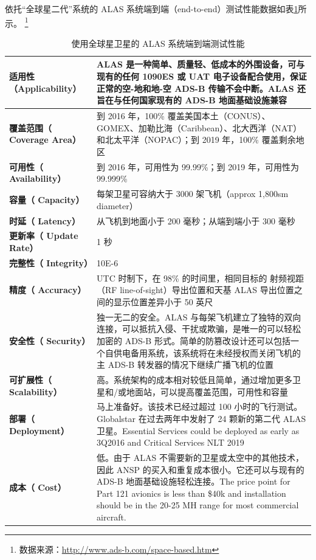 依托“全球星二代”系统的 ALAS 系统端到端（end-to-end）测试性能数据如表\ref{tab:alas-paras}所示。 \footnote{数据来源：\url{http://www.ads-b.com/space-based.htm}}

\renewcommand\arraystretch{1.5}
\begin{table}[htbp]
\centering
\caption{使用全球星卫星的 ALAS 系统端到端测试性能}
\label{tab:alas-paras}
\begin{tabular}[b]{|p{4cm}<{\raggedleft}|p{11cm}<{\raggedright}|}
\hline
\textbf{适用性
（Applicability）} &
ALAS 是一种简单、质量轻、低成本的外围设备，可与现有的任何 1090ES 或 UAT 电子设备配合使用，保证正常的空-地和地-空 ADS-B 传输不会中断。ALAS 还旨在与任何国家现有的 ADS-B 地面基础设施兼容\\
\hline
\textbf{覆盖范围（
Coverage Area）} &
到 2016 年，100\% 覆盖美国本土（CONUS）、GOMEX、加勒比海（Caribbean）、北大西洋（NAT）和北太平洋（NOPAC）；到 2019 年，100\% 覆盖剩余地区\\
\hline
\textbf{可用性（
Availability）} & 到 2016 年，可用性为 99.99\%；到 2019 年，可用性为 99.999\% \\
\hline
\textbf{容量（
Capacity） }& 每架卫星可容纳大于 3000 架飞机（approx 1,800sm diameter）\\
\hline
\textbf{时延（
Latency）} &  从飞机到地面小于 200 毫秒；从端到端小于 300 毫秒 \\
\hline
\textbf{更新率（
Update Rate）} & 1 秒 \\
\hline
\textbf{完整性（
Integrity）} & 10E-6 \\
\hline
\textbf{精度（
Accuracy）} &
UTC 时制下，在 98\% 的时间里，相同目标的 射频视距（RF line-of-sight）导出位置和天基 ALAS 导出位置之间的显示位置差异小于 50 英尺\\
\hline
\textbf{安全性（
Security）} & 独一无二的安全。ALAS 与每架飞机建立了独特的双向连接，可以抵抗入侵、干扰或欺骗，是唯一的可以轻松加密的 ADS-B 形式。简单的防篡改设计还可以包括一个自供电备用系统，该系统将在未经授权而关闭飞机的主 ADS-B 转发器的情况下继续广播飞机的位置 \\
\hline
\textbf{可扩展性（
Scalability）}  & 高。系统架构的成本相对较低且简单，通过增加更多卫星和/或地面站，可以提高覆盖范围，可用性和容量 \\
\hline
\textbf{部署（
Deployment）} & 马上准备好。该技术已经过超过 100 小时的飞行测试。Globalstar 在过去两年中发射了 24 颗新的第二代 ALAS 卫星。Essential Services could be deployed as early as 3Q2016 and Critical Services NLT 2019\\
\hline
\textbf{成本（
Cost）} & 低。由于 ALAS 不需要新的卫星或太空中的其他技术，因此 ANSP 的买入和重复成本很小。它还可以与现有的 ADS-B 地面基础设施轻松连接。The price point for Part 121 avionics is less than \$40k and installation should be in the 20-25 MH range for most commercial aircraft. \\
\hline
\end{tabular}

\end{table}